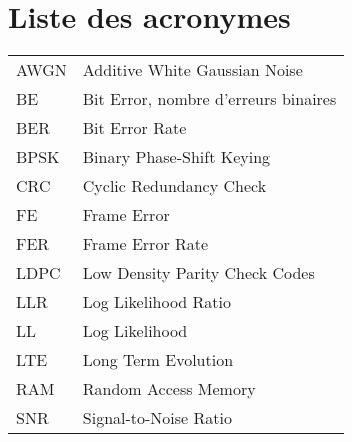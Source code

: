 \chapter*{Liste des acronymes}
\begin{center}

\begin{longtable}{ p{}  p{} } 

AWGN 		&   Additive White Gaussian Noise	 																	\\
BE 			& 	Bit Error, nombre d'erreurs binaires	 															\\
BER 		&   Bit Error Rate																						\\
BPSK 		&	Binary Phase-Shift Keying																			\\
CRC 		& 	Cyclic Redundancy Check 																			\\
FE 			& 	Frame Error	 																						\\
FER 		&   Frame Error Rate																					\\
LDPC 		& 	Low Density Parity Check Codes	 																	\\
LLR 		&  	Log Likelihood Ratio	 																			\\
LL 	 		&  	Log Likelihood	 																					\\
LTE			& 	Long Term Evolution 																				\\
RAM			& 	Random Access Memory																				\\
SNR			&	Signal-to-Noise Ratio																				\\


\end{longtable}

\end{center}

